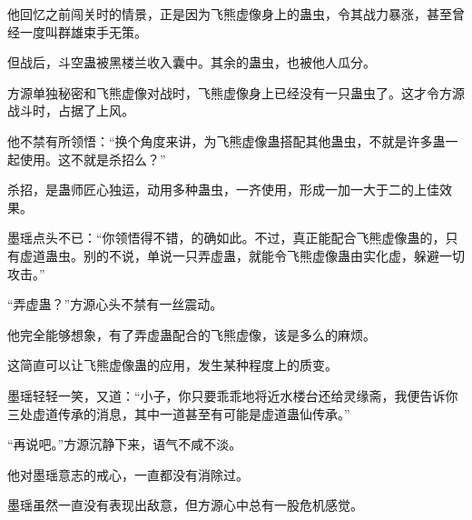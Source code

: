 \begin{this_body}
他回忆之前闯关时的情景，正是因为飞熊虚像身上的蛊虫，令其战力暴涨，甚至曾经一度叫群雄束手无策。

但战后，斗空蛊被黑楼兰收入囊中。其余的蛊虫，也被他人瓜分。

方源单独秘密和飞熊虚像对战时，飞熊虚像身上已经没有一只蛊虫了。这才令方源战斗时，占据了上风。

他不禁有所领悟：“换个角度来讲，为飞熊虚像蛊搭配其他蛊虫，不就是许多蛊一起使用。这不就是杀招么？”

杀招，是蛊师匠心独运，动用多种蛊虫，一齐使用，形成一加一大于二的上佳效果。

墨瑶点头不已：“你领悟得不错，的确如此。不过，真正能配合飞熊虚像蛊的，只有虚道蛊虫。别的不说，单说一只弄虚蛊，就能令飞熊虚像蛊由实化虚，躲避一切攻击。”

“弄虚蛊？”方源心头不禁有一丝震动。

他完全能够想象，有了弄虚蛊配合的飞熊虚像，该是多么的麻烦。

这简直可以让飞熊虚像蛊的应用，发生某种程度上的质变。

墨瑶轻轻一笑，又道：“小子，你只要乖乖地将近水楼台还给灵缘斋，我便告诉你三处虚道传承的消息，其中一道甚至有可能是虚道蛊仙传承。”

“再说吧。”方源沉静下来，语气不咸不淡。

他对墨瑶意志的戒心，一直都没有消除过。

墨瑶虽然一直没有表现出敌意，但方源心中总有一股危机感觉。

\end{this_body}

